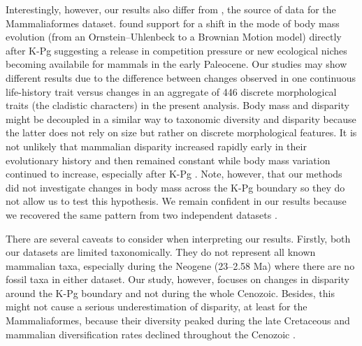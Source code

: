 \documentclass[12pt,letterpaper]{article}
\begin{document}
Interestingly, however, our results also differ from \cite{Slater2012MEE}, the source of data for the Mammaliaformes dataset.
\cite{Slater2012MEE} found support for a shift in the mode of body mass evolution (from an Ornstein--Uhlenbeck to a Brownian Motion model) directly after K-Pg suggesting a release in competition pressure or new ecological niches becoming availabile for mammals in the early Paleocene.
Our studies may show different results due to the difference between changes observed in one continuous life-history trait \citep[body mass;][]{Slater2012MEE} versus changes in an aggregate of 446 discrete morphological traits (the cladistic characters) in the present analysis.
Body mass and disparity might be decoupled in a similar way to taxonomic diversity and disparity \citep[e.g.][]{slaterCetacean,ruta2013,hopkinsdecoupling2013} because the latter does not rely on size but rather on discrete morphological features.
It is not unlikely that mammalian disparity increased rapidly early in their evolutionary history and then remained constant \citep[Figure \ref{fig:Fig_Raw_results};][]{Close2015,Lee2015R759} while body mass variation continued to increase, especially after K-Pg \citep{Slater2012MEE}.
Note, however, that our methods did not investigate changes in body mass across the K-Pg boundary so they do not allow us to test this hypothesis.
We remain confident in our results because we recovered the same pattern from two independent datasets \citep{Slater2012MEE,beckancient2014}.

There are several caveats to consider when interpreting our results. 
Firstly, both our datasets are limited taxonomically.
They do not represent all known mammalian taxa, especially during the Neogene (23--2.58 Ma) where there are no fossil taxa in either dataset.
Our study, however, focuses on changes in disparity around the K-Pg boundary and not during the whole Cenozoic.
Besides, this might not cause a serious underestimation of disparity, at least for the Mammaliaformes, because their diversity peaked during the late Cretaceous \citep[Campanian; 72.1--83.6 Ma;][]{Newham201432} and mammalian diversification rates declined throughout the Cenozoic \citep{Raia2012}.
\end{document}
